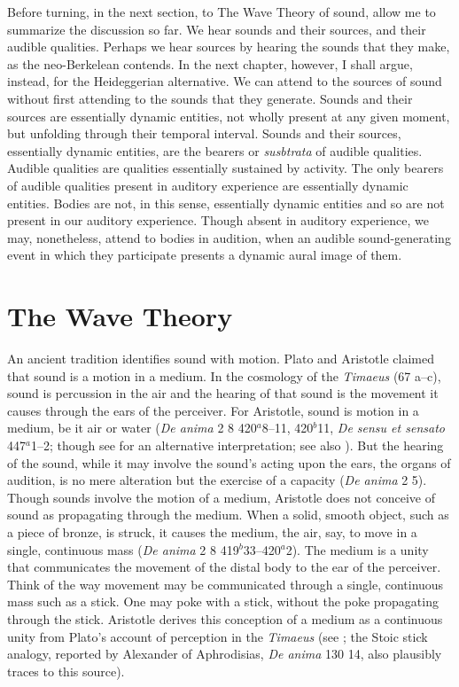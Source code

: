 Before turning, in the next section, to The Wave Theory of sound, allow me to summarize the discussion so far. We hear sounds and their sources, and their audible qualities. Perhaps we hear sources by hearing the sounds that they make, as the neo-Berkelean contends. In the next chapter, however, I shall argue, instead, for the Heideggerian alternative. We can attend to the sources of sound without first attending to the sounds that they generate. Sounds and their sources are essentially dynamic entities, not wholly present at any given moment, but unfolding through their temporal interval. Sounds and their sources, essentially dynamic entities, are the bearers or \emph{susbtrata} of audible qualities. Audible qualities are qualities essentially sustained by activity. The only bearers of audible qualities present in auditory experience are essentially dynamic entities. Bodies are not, in this sense, essentially dynamic entities and so are not present in our auditory experience. Though absent in auditory experience, we may, nonetheless, attend to bodies in audition, when an audible sound-generating event in which they participate presents a dynamic aural image of them.



\section{The Wave Theory} %
\label{sec:the_wave_theory}

An ancient tradition identifies sound with motion. Plato and Aristotle claimed that sound is a motion in a medium. In the cosmology of the \emph{Timaeus} (67 a--c), sound is percussion in the air and the hearing of that sound is the movement it causes through the ears of the perceiver. For Aristotle, sound is motion in a medium, be it air or water (\emph{De anima} 2 8 420\( ^{a} \)8--11, 420\( ^{b} \)11, \emph{De sensu et sensato} 447\( ^{a} \)1--2; though see \citealt[60--1]{OCallaghan:2007xy} for an alternative interpretation; see also \citealt{Johnstone:2013la}). But the hearing of the sound, while it may involve the sound's acting upon the ears, the organs of audition, is no mere alteration but the exercise of a capacity (\emph{De anima} 2 5). Though sounds involve the motion of a medium, Aristotle does not conceive of sound as propagating through the medium. When a solid, smooth object, such as a piece of bronze, is struck, it causes the medium, the air, say, to move in a single, continuous mass (\emph{De anima} 2 8 419\( ^{b} \)33--420\( ^{a} \)2). The medium is a unity that communicates the movement of the distal body to the ear of the perceiver. Think of the way movement may be communicated through a single, continuous mass such as a stick. One may poke with a stick, without the poke propagating through the stick. Aristotle derives this conception of a medium as a continuous unity from Plato's account of perception in the \emph{Timaeus} (see \citealt[chapter 1]{Lindberg:1977aa}; the Stoic stick analogy, reported by Alexander of Aphrodisias, \emph{De anima} 130 14, also plausibly traces to this source). 

